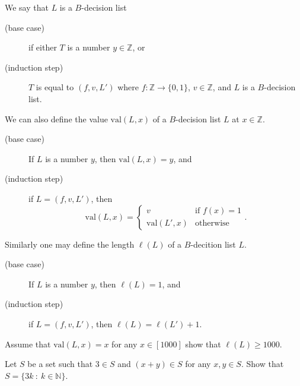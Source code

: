 \documentclass[addpoints]{exam}
\begin{document}
  \pagestyle{headandfoot}
  \runningheadrule

  \firstpagefooter{}{}{}
  \runningfooter{}{}{}
  \begin{flushright}

    \vspace{0.2in}
  \end{flushright}

  \begin{questions}
    \question[10]
      We say that $L$ is a $B$-decision list 
			\begin{description}
			  \item[(base case)] if either $T$ is a number $y \in \mathbb{Z}$, or
			  \item[(induction step)] $T$ is equal to $(f, v, L')$ where $f : \mathbb{Z} \to
			  \{0, 1\}$, $v \in \mathbb{Z}$, and $L$ is a $B$-decision list.
			\end{description}
			
			We can also define the value $\mathrm{val}(L, x)$ of a $B$-decision list $L$ at
			$x \in \mathbb{Z}$.
			\begin{description}
			  \item[(base case)] If $L$ is a number $y$, then $\mathrm{val}(L, x) = y$, and
			  \item[(induction step)] if $L = (f, v, L')$, then
			    \[
			      \mathrm{val}(L, x) = 
			      \begin{cases}
			        v & \text{if } f(x) = 1 \\
			        \mathrm{val}(L', x) & \text{otherwise}
			      \end{cases}.
			    \]
			\end{description}
			
			Similarly one may define the length $\ell(L)$ of a $B$-decition list $L$.
			\begin{description}
			  \item[(base case)] If $L$ is a number $y$, then $\ell(L) = 1$, and
			  \item[(induction step)] if $L = (f, v, L')$, then $\ell(L) = \ell(L') + 1$.
			\end{description}
			
			Assume that $\mathrm{val}(L, x) = x$ for any $x \in [1000]$ show that 
			$\ell(L) \ge 1000$.

      \begin{solution}[\stretch{1}]
      \end{solution}
      \newpage
    \question[10]
      Let $S$ be a set such that $3 \in S$ and $(x + y) \in S$ for any $x, y \in S$.
			Show that $S = \{3k ~:~ k \in \mathbb{N}\}$.

      \begin{solution}[\stretch{1}]
      \end{solution}
      \newpage
  \end{questions}
\end{document}
